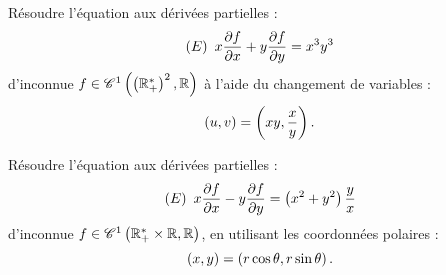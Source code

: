 \begin{corr}
\end{corr}

\begin{exo}[Exercice 12]
Résoudre l'équation aux dérivées partielles : \[\left(E\right)~x\pdv{f}{x}+y\pdv{f}{y}=x^3y^3\] d'inconnue \(f\in\mathscr{C}^{1}\left(\left(\mathbb{R}_+^*\right)^2,\mathbb{R}\right)\) à l'aide du changement de variables : \[\left(u,v\right)=\left(xy,\dfrac{x}{y}\right).\]
\end{exo}

\begin{corr}
\end{corr}

\begin{exo}[Exercice 13]
Résoudre l'équation aux dérivées partielles : \[\left(E\right)~x\pdv{f}{x}-y\pdv{f}{y}=\left(x^2+y^2\right)\dfrac{y}{x}\] d'inconnue \(f\in\mathscr{C}^{1}\left(\mathbb{R}_+^*\times\mathbb{R},\mathbb{R}\right)\), en utilisant les coordonnées polaires : \[\left(x,y\right)=\left(r\cos\theta,r\sin\theta\right).\] 
\end{exo}

\begin{corr}
\end{corr}